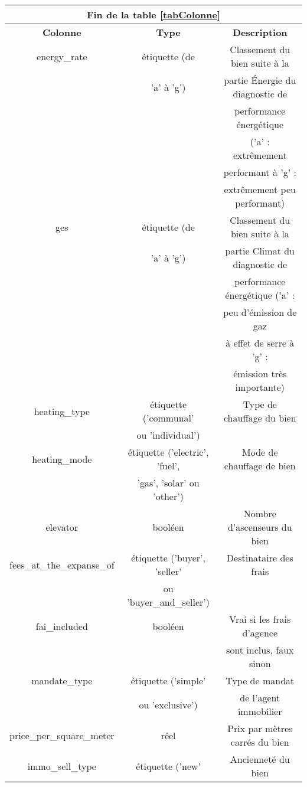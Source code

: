 \documentclass[a4paper, 12pt, twoside]{report}
\begin{document}
\begin{longtable}[c]{|c|c|c|}
			\hline
			\multicolumn{3}{|c|}{Fin de la table \ref{tabColonne}}\\
				\hline
				{\bf Colonne} & {\bf Type} & {\bf Description} \\
				\hline
				energy\_rate & étiquette (de & Classement du bien suite à la \\ 
				& 'a' à 'g') & partie Énergie du diagnostic de \\ 
				& & performance énergétique \\ 
				& & ('a' : extrêmement  \\ 
				& & performant à 'g' : \\
				& & extrêmement peu performant) \\
 				\hline
				ges & étiquette (de & Classement du bien suite à la \\ 
				& 'a' à 'g') & partie Climat du diagnostic de \\ 
				& & performance énergétique ('a' : \\ 
				& & peu d'émission de gaz \\ 
				& & à effet de serre à 'g' : \\ 
				& & émission très importante) \\ 
				\hline
				heating\_type & étiquette ('communal' & Type de chauffage du bien \\
				& ou 'individual') & \\ 
				\hline
				heating\_mode & étiquette ('electric', 'fuel', & Mode de chauffage de bien \\
				& 'gas', 'solar' ou 'other') & \\ 
				\hline
				elevator & booléen & Nombre d'ascenseurs du bien \\ 
				\hline
				fees\_at\_the\_expanse\_of & étiquette ('buyer', 'seller' & Destinataire des frais \\
				& ou 'buyer\_and\_seller') & \\ 
				\hline
				fai\_included & booléen & Vrai si les frais d'agence \\ 
				& & sont inclus, faux sinon \\ 
				\hline
				mandate\_type & étiquette ('simple' & Type de mandat \\
				& ou 'exclusive') & de l'agent immobilier \\ 
				\hline
				price\_per\_square\_meter & réel & Prix par mètres carrés du bien \\ 
				\hline
				immo\_sell\_type & étiquette ('new' & Ancienneté du bien \\ 

\end{longtable}
\end{document}
